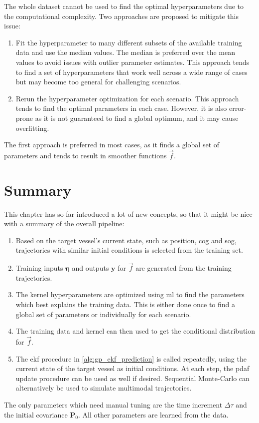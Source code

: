 The whole dataset cannot be used to find the optimal hyperparameters due to the computational complexity. Two approaches are proposed to mitigate this issue:
\begin{enumerate}
    \item Fit the hyperparameter to many different subsets of the available training data and use the median values. The median is preferred over the mean values to avoid issues with outlier parameter estimates. This approach tends to find a set of hyperparameters that work well across a wide range of cases but may become too general for challenging scenarios.
    \item Rerun the hyperparameter optimization for each scenario. This approach tends to find the optimal parameters in each case. However, it is also error-prone as it is not guaranteed to find a global optimum, and it may cause overfitting.
\end{enumerate}

The first approach is preferred in most cases, as it finds a global set of parameters and tends to result in smoother functions $\vec{f}$.


\section{Summary}
This chapter has so far introduced a lot of new concepts, so that it might be nice with a summary of the overall pipeline:

\begin{enumerate}
    \item Based on the target vessel's current state, such as position, \acrshort{cog} and \acrshort{sog}, trajectories with similar initial conditions is selected from the training set.
    \item Training inputs $\boldsymbol{\eta}$ and outputs $\boldsymbol{y}$ for $\vec{f}$ are generated from the training trajectories.
    \item The kernel hyperparameters are optimized using \acrshort{ml} to find the parameters which best explains the training data. This is either done once to find a global set of parameters or individually for each scenario.
    \item The training data and kernel can then used to get the conditional distribution for $\vec{f}$.
    \item The \acrshort{ekf} procedure in \cref{alg:gp_ekf_prediction} is called repeatedly, using the current state of the target vessel as initial conditions. At each step, the \acrshort{pdaf} update procedure can be used as well if desired. Sequential Monte-Carlo can alternatively be used to simulate multimodal trajectories.
\end{enumerate}

The only parameters which need manual tuning are the time increment $\Delta \tau$ and the initial covariance $\boldsymbol{P}_0$. All other parameters are learned from the data.
